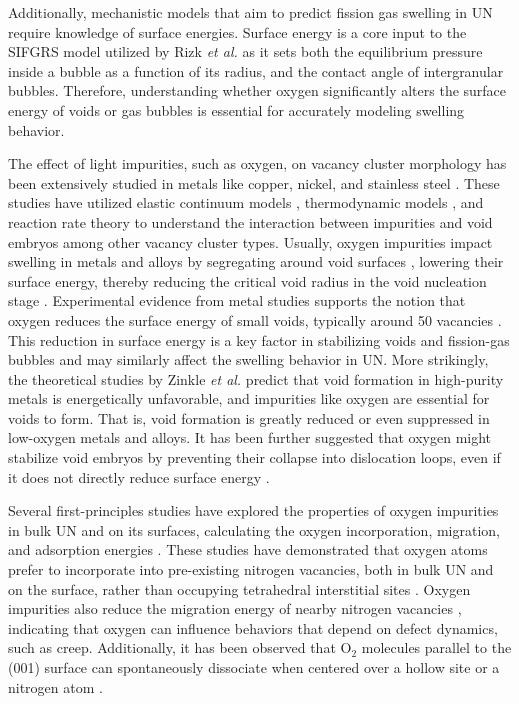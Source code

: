 \documentclass[preprint,12pt,sort&compress]{elsarticle}
\newcommand{\?}{\stackrel{?}{=}}
\begin{document}
Additionally, mechanistic models that aim to predict fission gas swelling in UN require knowledge of surface energies. Surface energy is a core input to the SIFGRS model utilized by Rizk \textit{et al.} \cite{Rizk2025} as it sets both the equilibrium pressure inside a bubble as a function of its radius, and the contact angle of intergranular bubbles. Therefore, understanding whether oxygen significantly alters the surface energy of voids or gas bubbles is essential for accurately modeling swelling behavior.

The effect of light impurities, such as oxygen, on vacancy cluster morphology has been extensively studied in metals like copper, nickel, and stainless steel \cite{Zinkle1987a, Zinkle1987b, Zinkle1990, Igata1998}. These studies have utilized elastic continuum models \cite{Zinkle1987a, Zinkle1987b}, thermodynamic models \cite{Zinkle1990}, and reaction rate theory \cite{Igata1998} to understand the interaction between impurities and void embryos among other vacancy cluster types. Usually, oxygen impurities impact swelling in metals and alloys by segregating around void surfaces \cite{McLean1957}, lowering their surface energy, thereby reducing the critical void radius in the void nucleation stage \cite{Zinkle1987a, Igata1998}. Experimental evidence from metal studies supports the notion that oxygen reduces the surface energy of small voids, typically around 50 vacancies \cite{Zinkle1990}. This reduction in surface energy is a key factor in stabilizing voids and fission-gas bubbles and may similarly affect the swelling behavior in UN. More strikingly, the theoretical studies by Zinkle \textit{et al.} \cite{Zinkle1987a, Zinkle1987b} predict that void formation in high-purity metals is energetically unfavorable, and impurities like oxygen are essential for voids to form. That is, void formation is greatly reduced or even suppressed in low-oxygen metals and alloys. It has been further suggested that oxygen might stabilize void embryos by preventing their collapse into dislocation loops, even if it does not directly reduce surface energy \cite{Zinkle1987b, Zinkle1990}.

Several first-principles studies have explored the properties of oxygen impurities in bulk UN and on its surfaces, calculating the oxygen incorporation, migration, and adsorption energies \cite{Kotomin2008, Kotomin2009, Zhukovskii2009JNM, Zhukovskii2009SS, Bocharov2011JNM, Bocharov2011SS, Bocharov2013, Lopes2016, Schuler2017, Zergoug2018, Sikorski2021}. These studies have demonstrated that oxygen atoms prefer to incorporate into pre-existing nitrogen vacancies, both in bulk UN and on the surface, rather than occupying tetrahedral interstitial sites \cite{Kotomin2008, Bocharov2013}. Oxygen impurities also reduce the migration energy of nearby nitrogen vacancies \cite{Kotomin2009}, indicating that oxygen can influence behaviors that depend on defect dynamics, such as creep. Additionally, it has been observed that O$_2$ molecules parallel to the (001) surface can spontaneously dissociate when centered over a hollow site or a nitrogen atom \cite{Zhukovskii2009JNM}.
\end{document}
